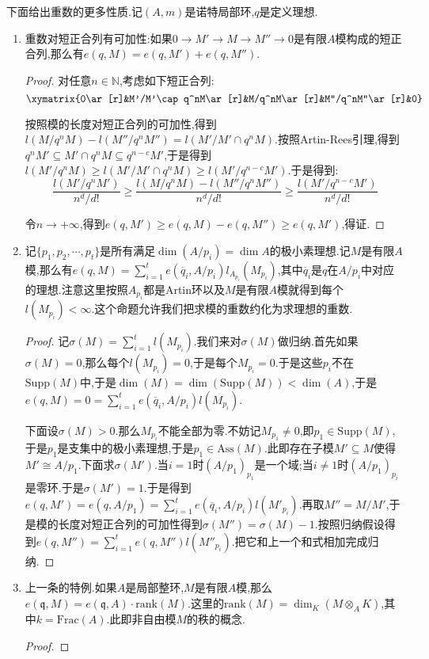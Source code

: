 下面给出重数的更多性质.记$(A,m)$是诺特局部环,$q$是定义理想.
\begin{enumerate}
	\item 重数对短正合列有可加性:如果$0\to M'\to M\to M''\to0$是有限$A$模构成的短正合列,那么有$e(q,M)=e(q,M')+e(q,M'')$.
	\begin{proof}
		
		对任意$n\in\mathbb{N}$,考虑如下短正合列:
		$$\xymatrix{0\ar[r]&M'/M'\cap q^nM\ar[r]&M/q^nM\ar[r]&M''/q^nM''\ar[r]&0}$$
		
		按照模的长度对短正合列的可加性,得到$l(M/q^nM)-l(M''/q^nM'')=l(M'/M'\cap q^nM)$.按照Artin-Rees引理,得到$q^nM'\subseteq M'\cap q^nM\subseteq q^{n-c}M'$,于是得到$l(M'/q^nM)\ge l(M'/M'\cap q^nM)\ge l(M'/q^{n-c}M')$.于是得到:
		$$\frac{l(M'/q^nM')}{n^d/d!}\ge\frac{l(M/q^nM)-l(M''/q^nM'')}{n^d/d!}\ge\frac{l(M'/q^{n-c}M')}{n^d/d!}$$
		
		令$n\to+\infty$,得到$e(q,M')\ge e(q,M)-e(q,M'')\ge e(q,M')$,得证.
	\end{proof}
	\item 记$\{p_1,p_2,\cdots,p_t\}$是所有满足$\dim(A/p_i)=\dim A$的极小素理想.记$M$是有限$A$模,那么有$e(q,M)=\sum_{i=1}^te(\overline{q}_i,A/p_i)l_{A_{p_i}}(M_{p_i})$,其中$\overline{q}_i$是$q$在$A/p_i$中对应的理想.注意这里按照$A_{p_i}$都是Artin环以及$M$是有限$A$模就得到每个$l(M_{p_i})<\infty$.这个命题允许我们把求模的重数约化为求理想的重数.
	\begin{proof}
		
		记$\sigma(M)=\sum_{i=1}^tl(M_{p_i})$.我们来对$\sigma(M)$做归纳.首先如果$\sigma(M)=0$,那么每个$l(M_{p_i})=0$,于是每个$M_{p_i}=0$.于是这些$p_i$不在$\mathrm{Supp}(M)$中,于是$\dim(M)=\dim(\mathrm{Supp}(M))<\dim(A)$,于是$e(q,M)=0=\sum_{i=1}^te(\overline{q}_i,A/p_i)l(M_{p_i})$.
		
		下面设$\sigma(M)>0$.那么$M_{p_i}$不能全部为零.不妨记$M_{p_1}\not=0$,即$p_1\in\mathrm{Supp}(M)$,于是$p_1$是支集中的极小素理想,于是$p_1\in\mathrm{Ass}(M)$.此即存在子模$M'\subseteq M$使得$M'\cong A/p_1$.下面求$\sigma(M')$.当$i=1$时$(A/p_1)_{p_1}$是一个域;当$i\not=1$时$(A/p_1)_{p_i}$是零环.于是$\sigma(M')=1$.于是得到$e(q,M')=e(q,A/p_1)=\sum_{i=1}^te(\overline{q}_i,A/p_i)l(M'_{p_i})$.再取$M''=M/M'$,于是模的长度对短正合列的可加性得到$\sigma(M'')=\sigma(M)-1$.按照归纳假设得到$e(q,M'')=\sum_{i=1}^te(q,M'')l(M''_{p_i})$.把它和上一个和式相加完成归纳.
	\end{proof}
	\item 上一条的特例.如果$A$是局部整环,$M$是有限$A$模,那么$e(\mathfrak{q},M)=e(\mathfrak{q},A)\cdot\mathrm{rank}(M)$.这里的$\mathrm{rank}(M)=\dim_K(M\otimes_AK)$,其中$k=\mathrm{Frac}(A)$.此即非自由模$M$的秩的概念.
	\begin{proof}
		

\end{proof}
\end{enumerate}
